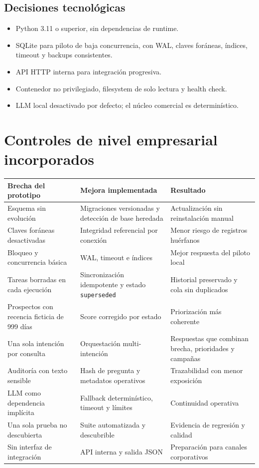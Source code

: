 \documentclass[11pt,a4paper]{article}
\begin{document}
\subsection{Decisiones tecnológicas}

\begin{itemize}
  \item Python 3.11 o superior, sin dependencias de runtime.
  \item SQLite para piloto de baja concurrencia, con WAL, claves foráneas,
  índices, timeout y backups consistentes.
  \item API HTTP interna para integración progresiva.
  \item Contenedor no privilegiado, filesystem de solo lectura y health check.
  \item LLM local desactivado por defecto; el núcleo comercial es determinístico.
\end{itemize}

\section{Controles de nivel empresarial incorporados}

\begin{longtable}{p{4cm}p{5.2cm}p{5.4cm}}
\toprule
\textbf{Brecha del prototipo} & \textbf{Mejora implementada} & \textbf{Resultado}\\
\midrule
\endhead
Esquema sin evolución & Migraciones versionadas y detección de base heredada &
Actualización sin reinstalación manual\\
Claves foráneas desactivadas & Integridad referencial por conexión & Menor riesgo
de registros huérfanos\\
Bloqueo y concurrencia básica & WAL, timeout e índices & Mejor respuesta del
piloto local\\
Tareas borradas en cada ejecución & Sincronización idempotente y estado
\texttt{superseded} & Historial preservado y cola sin duplicados\\
Prospectos con recencia ficticia de 999 días & Score corregido por estado &
Priorización más coherente\\
Una sola intención por consulta & Orquestación multi-intención & Respuestas que
combinan brecha, prioridades y campañas\\
Auditoría con texto sensible & Hash de pregunta y metadatos operativos &
Trazabilidad con menor exposición\\
LLM como dependencia implícita & Fallback determinístico, timeout y límites &
Continuidad operativa\\
Una sola prueba no descubierta & Suite automatizada y descubrible & Evidencia de
regresión y calidad\\
Sin interfaz de integración & API interna y salida JSON & Preparación para
canales corporativos\\
\bottomrule
\end{longtable}
\end{document}
